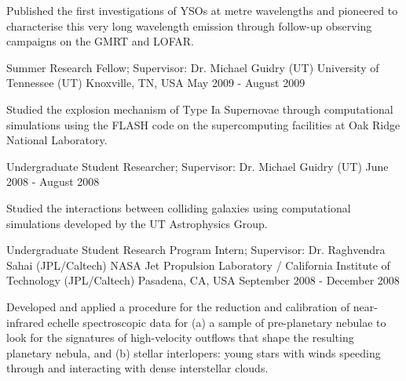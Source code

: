 \begin{cventries}
{\begin{cvitems}
        \item {Published the first investigations of YSOs at metre wavelengths and pioneered to characterise this very long wavelength emission through follow-up observing campaigns on the GMRT and LOFAR.}
      \end{cvitems} 
    }
\cventry
    {Summer Research Fellow; Supervisor: Dr. Michael Guidry (UT)}
    {University of Tennessee (UT)}
    {Knoxville, TN, USA}
    {May 2009 - August 2009}
    {
      \begin{cvitems}
        \item {Studied the explosion mechanism of Type Ia Supernovae through computational simulations using the FLASH code on the supercomputing facilities at Oak Ridge National Laboratory.}
      \end{cvitems}
    }
\cventry
    {Undergraduate Student Researcher; Supervisor: Dr. Michael Guidry (UT)}
    {}
    {}
    {June 2008 - August 2008}
    {
      \begin{cvitems}
        \item {Studied the interactions between colliding galaxies using computational simulations developed by the UT Astrophysics Group.}
      \end{cvitems}
    }
\cventry
    {Undergraduate Student Research Program Intern; Supervisor: Dr. Raghvendra Sahai (JPL/Caltech)}
    {NASA Jet Propulsion Laboratory / California Institute of Technology (JPL/Caltech)}
    {Pasadena, CA, USA}
    {September 2008 - December 2008}
    {
      \begin{cvitems}
        \item {Developed and applied a procedure for the reduction and calibration of near-infrared echelle spectroscopic data for (a)  a sample of pre-planetary nebulae to look for the signatures of high-velocity outflows that shape the resulting planetary nebula, and (b) stellar interlopers: young stars with winds speeding through and interacting with dense interstellar clouds.}
      \end{cvitems}
    }
\end{cventries}
